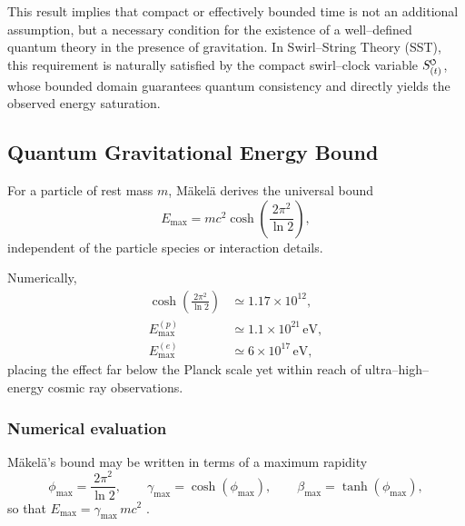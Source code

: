 \documentclass[11pt]{article}
\newcommand{\SwirlClock}{S_{(t)}^{\mkern-2mu\scriptscriptstyle\boldsymbol{\circlearrowleft}}}
\begin{document}
            This result implies that compact or effectively bounded time is not an
            additional assumption, but a necessary condition for the existence of a
            well--defined quantum theory in the presence of gravitation.
            In Swirl--String Theory (SST), this requirement is naturally satisfied by the
            compact swirl--clock variable $\SwirlClock$, whose bounded domain guarantees
            quantum consistency and directly yields the observed energy saturation.

        \subsection{Quantum Gravitational Energy Bound}

            For a particle of rest mass $m$, M\"akel\"a derives the universal bound
            \begin{equation}
                E_{\max}
                =
                m c^2 \cosh\!\left(\frac{2\pi^2}{\ln 2}\right),
                \label{eq:Makela_Emax}
            \end{equation}
            independent of the particle species or interaction details.

            Numerically,
            \begin{align}
                \cosh\!\left(\frac{2\pi^2}{\ln 2}\right)
                &\simeq 1.17\times 10^{12},\\
                E_{\max}^{(p)} &\simeq 1.1\times10^{21}\,\mathrm{eV},\\
                E_{\max}^{(e)} &\simeq 6\times10^{17}\,\mathrm{eV},
            \end{align}
            placing the effect far below the Planck scale yet within reach of
            ultra--high--energy cosmic ray observations.

            \subsubsection{Numerical evaluation}
                \label{app:energy_saturation:numerics}

                M\"akel\"a's bound may be written in terms of a maximum rapidity
            \begin{equation}
                \phi_{\max}=\frac{2\pi^2}{\ln 2},
                \qquad
                \gamma_{\max}=\cosh(\phi_{\max}),
                \qquad
                \beta_{\max}=\tanh(\phi_{\max}),
                \end{equation}
                so that $E_{\max}=\gamma_{\max}\,m c^2$ \cite{Makela2024QuantumGravity}.
\end{document}
